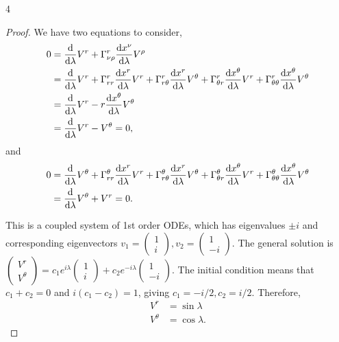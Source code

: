 \documentclass[11pt]{article}
\begin{document}
\begin{problem}{4}
\begin{enumerate}[label=(\alph*)]
          \begin{proof}
            We have two equations to consider,
            \begin{equation}
            \label{eq:18}
            \begin{aligned}
              0 &= \dv{\lambda}V^r + \Gamma_{\nu\rho}^r \dv{x^{\nu}}{\lambda}V^{\rho} \\
                &= \dv{\lambda}V^r + \Gamma_{rr}^r\dv{x^r}{\lambda}V^r + \Gamma_{r\theta}^r\dv{x^r}{\lambda}V^{\theta} + \Gamma_{\theta r}^r\dv{x^{\theta}}{\lambda}V^r + \Gamma_{\theta\theta}^r\dv{x^{\theta}}{\lambda}V^{\theta} \\
                &= \dv{\lambda}V^r - r\dv{x^{\theta}}{\lambda}V^{\theta} \\
              &= \dv{\lambda}V^r - V^{\theta} = 0,
            \end{aligned}
          \end{equation}
          and
          \begin{equation}
          \label{eq:19}
          \begin{aligned}
            0 &= \dv{\lambda}V^{\theta} + \Gamma_{rr}^{\theta}\dv{x^r}{\lambda}V^r + \Gamma_{r\theta}^{\theta}\dv{x^r}{\lambda}V^{\theta} + \Gamma_{\theta r}^{\theta}\dv{x^{\theta}}{\lambda}V^r + \Gamma_{\theta\theta}^{\theta}\dv{x^{\theta}}{\lambda}V^{\theta} \\
            &= \dv{\lambda}V^{\theta} + V^r = 0.
          \end{aligned}
        \end{equation}

        This is a coupled system of 1st order ODEs, which has eigenvalues \( \pm i \) and corresponding eigenvectors \( v_1 = \begin{pmatrix}
1 \\
i
 \end{pmatrix}, v_2 = \begin{pmatrix}
1 \\
   -i
 \end{pmatrix} \).
 The general solution is \( \begin{pmatrix}
V^r \\
V^{\theta}
 \end{pmatrix} = c_1e^{i\lambda} \begin{pmatrix}
1 \\
i
 \end{pmatrix} + c_2e^{-i\lambda} \begin{pmatrix}
1 \\
-i
 \end{pmatrix}\).
 The initial condition means that \( c_1 + c_2 = 0 \) and \( i(c_1-c_2) = 1 \), giving \( c_1 = -i/2, c_2 = i/2 \).
 Therefore,
 \begin{equation}
 \label{eq:21}
 \begin{aligned}
   V^r &= \sin \lambda \\
   V^{\theta} &= \cos\lambda.
 \end{aligned}
\end{equation}


\end{proof}
\end{enumerate}
\end{problem}
\end{document}
